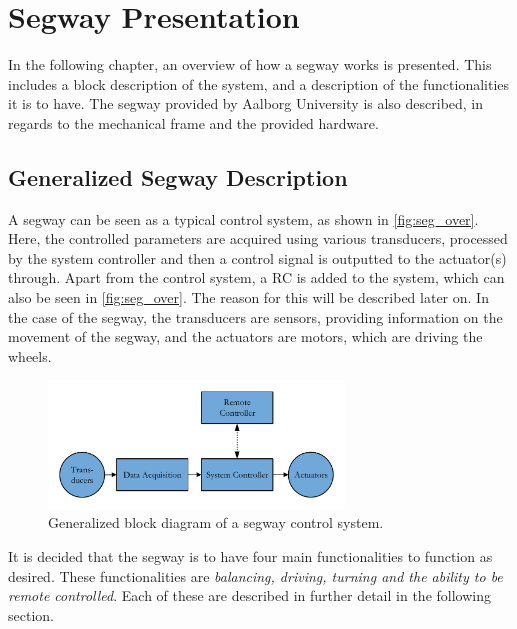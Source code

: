 \chapter{Segway Presentation}
In the following chapter, an overview of how a segway works is presented. This includes a block description of the system, and a description of the functionalities	 it is to have.
The segway provided by Aalborg University is also described, in regards to the mechanical frame and the provided hardware.

\section{Generalized Segway Description}
A segway can be seen as a typical control system, as shown in \autoref{fig:seg_over}.
Here, the controlled parameters are acquired using various transducers, processed by the system controller and then a control signal is outputted to the actuator(s) through. Apart from the control system, a \gls{RC} is added to the system, which can also be seen in \autoref{fig:seg_over}. The reason for this will be described later on. In the case of the segway, the transducers are sensors, providing information on the movement of the segway, and the actuators are motors, which are driving the wheels. 

\begin{figure}[H]
\centering
\includegraphics[width=0.7\textwidth]{figures/segwayOverview.pdf}
\caption{Generalized block diagram of a segway control system.}
\label{fig:seg_over}
\end{figure}

It is decided that the segway is to have four main functionalities to function as desired. These functionalities are \textit{balancing, driving, turning and the ability to be remote controlled}. Each of these are described in further detail in the following section.

